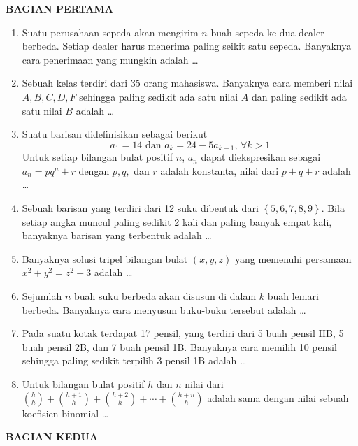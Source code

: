 \documentclass[12pt,twoside]{article}
\begin{document}
\textbf{BAGIAN PERTAMA}
\begin{enumerate}
	\item Suatu perusahaan sepeda akan mengirim $n$ buah sepeda ke dua dealer berbeda. Setiap dealer harus menerima paling seikit satu sepeda. Banyaknya cara penerimaan yang mungkin adalah \dots

	\item Sebuah kelas terdiri dari 35 orang mahasiswa. Banyaknya cara memberi nilai $A,B,C,D,F$ sehingga paling sedikit ada satu nilai $A$ dan paling sedikit ada satu nilai $B$ adalah \dots

	\item Suatu barisan didefinisikan sebagai berikut
	      \begin{equation*}
		      a_1 = 14 \text{ dan } a_k=24-5a_{k-1},\, \forall k>1
	      \end{equation*}
	      Untuk setiap bilangan bulat positif $n$, $a_n$ dapat diekspresikan sebagai $a_n = pq^n + r$ dengan $p,q,$ dan $r$ adalah konstanta, nilai dari $p+q+r$ adalah \dots

	\item Sebuah barisan yang terdiri dari 12 suku dibentuk dari $\left\lbrace 5,6,7,8,9\right\rbrace$. Bila setiap angka muncul paling sedikit 2 kali dan paling banyak empat kali, banyaknya barisan yang terbentuk adalah \dots

	\item Banyaknya solusi tripel bilangan bulat $(x,y,z)$ yang memenuhi persamaan $x^2+y^2 = z^2 + 3$ adalah \dots

	\item Sejumlah $n$ buah suku berbeda akan disusun di dalam $k$ buah lemari berbeda. Banyaknya cara menyusun buku-buku tersebut adalah \dots

	\item Pada suatu kotak terdapat 17 pensil, yang terdiri dari 5 buah pensil HB, 5 buah pensil 2B, dan 7 buah pensil 1B. Banyaknya cara memilih 10 pensil sehingga paling sedikit terpilih 3 pensil 1B adalah \dots

	\item Untuk bilangan bulat positif $h$ dan $n$ nilai dari \(\displaystyle
	      \binom{h}{h}+\binom{h+1}{h}+\binom{h+2}{h}+\cdots+\binom{h+n}{h}
	      \) adalah sama dengan nilai sebuah koefisien binomial \dots

\end{enumerate}
\pagebreak
\textbf{BAGIAN KEDUA}
\end{document}
